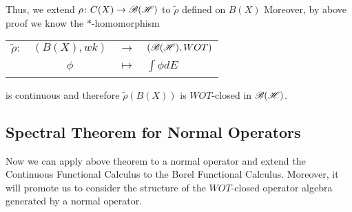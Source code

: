 \begin{rem}
	Thus, we extend $\rho \colon C(X) \rightarrow \mathscr{B(H)}$ to $\tilde{\rho}$ defined on $B(X)$ Moreover, by above proof we know the $*$-homomorphism
	\begin{center}
		\begin{tabular}{l c c l}
			$\tilde{\rho} \colon$ & $(B(X),wk)$ & $\longrightarrow$ & $(\mathscr{B(H)},WOT)$ \\
			~ & $\phi$ & $\longmapsto$ & $\int \phi dE$
		\end{tabular}
	\end{center}
	is continuous and therefore $\tilde{\rho}(B(X))$ is $WOT$-closed in $\mathscr{B(H)}$.
\end{rem}

\subsection{Spectral Theorem for Normal Operators}

Now we can apply above theorem to a normal operator and extend the Continuous Functional Calculus to the Borel Functional Calculus. Moreover, it will promote us to consider the structure of the $WOT$-closed operator algebra generated by a normal operator.


